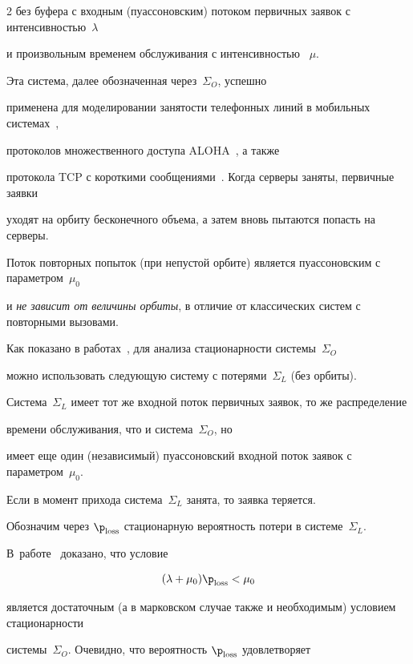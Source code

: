\begin{multicols}{2}
без буфера  с входным (пуассоновским) потоком первичных заявок с интенсивностью~$\lambda$


 и произвольным  временем  обслуживания  с интенсивностью~ $\mu$.  


 Эта сис\-те\-ма, далее обозначенная через~$\Sigma_O$,  успешно


применена для моделировании занятости телефонных линий в мобильных сис\-те\-мах~\cite{F86}, 


протоколов множественного доступа ALOHA~\cite{C93}, а также


 протокола  TCP с короткими сообщениями~\cite{AY08}. Когда серверы заняты, первичные заявки


 уходят  на орбиту  бесконечного объема, а затем вновь пытаются попасть  на серверы.


  Поток повторных попыток (при непустой орбите) является пуассоновским с  па\-ра\-мет\-ром~$\mu_0$ 


  и  {\it не зависит от величины орбиты}, в отличие от классических  сис\-тем с повторными вызовами.


Как показано в работах~\cite{Avr, GM, MorNek},  для анализа стационарности сис\-те\-мы~$\Sigma_O$


можно использовать  следующую сис\-те\-му с потерями~$\Sigma_L$ (без орбиты).


 Сис\-те\-ма~$\Sigma_L$ имеет  тот же входной   поток первичных заявок, то же распределение


  времени обслуживания, что и сис\-те\-ма~$\Sigma_O$, но


  имеет еще  один (независимый) пуассоновский входной поток заявок с параметром~$\mu_0$.


 Если в момент прихода  сис\-те\-ма~$\Sigma_L$ занята, то заявка   теряется.


 Обозначим через $\p_{\mathrm{loss}}$ стационарную вероятность потери в сис\-те\-ме~$ \Sigma_L $. 


 В~работе~\cite {Avr} доказано,  что условие 


 \begin{equation}


(\lambda+\mu_0)\p_{\mathrm{loss}}<\mu_0 


\label{st_cond}


\end{equation}


является достаточным (а в марковском случае также и необходимым) условием стационарности


сис\-те\-мы~$\Sigma_O$. Очевидно, что вероятность $\p_{\mathrm{loss}}$ удовлетворяет



\end{multicols}
